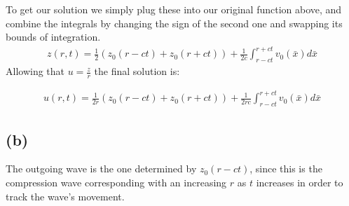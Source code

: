 \documentclass{article}
\begin{document}
To get our solution we simply plug these into our original function above, and combine the integrals by changing the sign of the second one and swapping its bounds of integration.
\begin{equation}
\begin{aligned}
z(r,t) = \frac{1}{2}(z_0(r-ct) + z_0(r + ct)) + \frac{1}{2c}\int_{r-ct}^{r+ct}v_0(\bar{x})d\bar{x}
\end{aligned}
\end{equation}
Allowing that $u = \frac{z}{r}$ the final solution is:
\begin{tcolorbox}[minipage,colback=white,arc=0pt,outer arc=0pt]
\begin{equation}
\begin{aligned}
u(r,t) = \frac{1}{2r}(z_0(r-ct) + z_0(r + ct)) + \frac{1}{2rc}\int_{r-ct}^{r+ct}v_0(\bar{x})d\bar{x}
\end{aligned}
\end{equation}
\end{tcolorbox}
\subsection*{\textbf{(b)}}
The outgoing wave is the one determined by $z_0(r-ct)$, since this is the compression wave corresponding with an increasing $r$ as $t$ increases in order to track the wave's movement.
\end{document}
